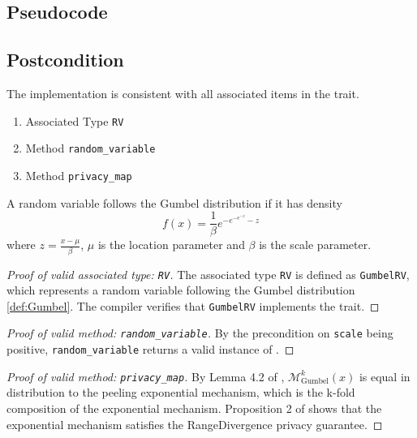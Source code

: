 \documentclass{article}
\begin{document}
\subsection*{Pseudocode} 
\label{sec:python-pseudocode} 
 
 
\subsection*{Postcondition} 
\begin{theorem}
    The implementation is consistent with all associated items in the  trait.
    \begin{enumerate}
        \item Associated Type \texttt{RV}
        \item Method \texttt{random\_variable} 
        \item Method \texttt{privacy\_map}
    \end{enumerate}
\end{theorem}

\begin{definition}
    \label{def:Gumbel}
    A random variable follows the Gumbel distribution if it has density
    \begin{equation}
        f(x) = \frac{1}{\beta} e^{-e^{-e^{-z}} - z}
    \end{equation}
    where $z = \frac{x - \mu}{\beta}$,
    $\mu$ is the location parameter and $\beta$ is the scale parameter.
\end{definition}

\begin{proof}[Proof of valid associated type: \texttt{RV}]
    The associated type \texttt{RV} is defined as \texttt{GumbelRV},
    which represents a random variable following the Gumbel distribution \ref{def:Gumbel}.
    The compiler verifies that \texttt{GumbelRV} implements the  trait.
\end{proof}

\begin{proof}[Proof of valid method: \texttt{random\_variable}]
    By the precondition on \texttt{scale} being positive, 
    \texttt{random\_variable} returns a valid instance of .
\end{proof}

\begin{proof}[Proof of valid method: \texttt{privacy\_map}]
    By Lemma 4.2 of \cite{Durfee2019PracticalDP}, $\mathcal{M}_{\mathrm{Gumbel}}^k(x)$ is equal in distribution to the peeling exponential mechanism,
    which is the k-fold composition of the exponential mechanism.
    Proposition 2 of \cite{Dong2019OptimalDP} shows that the exponential mechanism satisfies the RangeDivergence privacy guarantee.
\end{proof}

 
 
\end{document}
